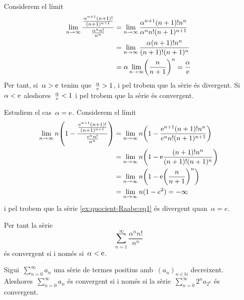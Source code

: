 \documentclass[../../main.tex]{subfiles}
\begin{document}
    \begin{solution}
        Considerem el límit
        \begin{align*}
            \lim_{n\to\infty}\frac{\frac{\alpha^{n+1}(n+1)!}{(n+1)^{n+1}}}{\frac{\alpha^{n}n!}{n^{n}}}&=\lim_{n\to\infty}\frac{\alpha^{n+1}(n+1)!n^{n}}{\alpha^{n}n!(n+1)^{n+1}} \\
            &=\lim_{n\to\infty}\frac{\alpha(n+1)!n^{n}}{(n+1)!(n+1)^{n}} \\
            &=\alpha\lim_{n\to\infty}\left(\frac{n}{n+1}\right)^{n}=\frac{\alpha}{\e} %
        \end{align*}
        Per tant, si~\(\alpha>\mathrm{e}\) tenim que~\(\frac{\alpha}{\mathrm{e}}>1\), i pel  trobem que la sèrie és divergent.
        Si~\(\alpha<\mathrm{e}\) aleshores~\(\frac{\alpha}{\mathrm{e}}<1\) i pel  trobem que la sèrie és convergent.

        Estudiem el cas~\(\alpha=\mathrm{e}\).
        Considerem el límit
        \begin{align*}
            \lim_{n\to\infty}n\left(1-\frac{\frac{\e^{n+1}(n+1)!}{(n+1)^{n+1}}}{\frac{\e^{n}n!}{n^{n}}}\right)&=\lim_{n\to\infty}n\left(1-\frac{\e^{n+1}(n+1)!n^{n}}{e^{n}n!(n+1)^{n+1}}\right) \\
            &=\lim_{n\to\infty}n\left(1-\e\frac{(n+1)!n^{n}}{(n+1)!(n+1)^{n}}\right) \\
            &=\lim_{n\to\infty}n\left(1-\e\left(\frac{n}{n+1}\right)^{n}\right) \\
            &=\lim_{n\to\infty}n(1-e^{2})=-\infty %
        \end{align*}
        i pel  trobem que la sèrie \eqref{ex:quocient-Raabe:eq1} és divergent quan~\(\alpha=e\).

        Per tant la sèrie
        \[
            \sum_{n=1}^{\infty}\frac{\alpha^{n}n!}{n^{n}}
        \]
        és convergent si i només si~\(\alpha<\mathrm{e}\).
    \end{solution}
    \begin{proposition}
        \label{prop:criteri-de-condensacio}
        Sigui~\(\sum_{n=0}^{\infty}a_{n}\) una sèrie de termes positius amb~\((a_{n})_{n\in\mathbb{N}}\) decreixent.
        Aleshores~\(\sum_{n=0}^{\infty}a_{n}\) és convergent si i només si la sèrie~\(\sum_{n=0}^{\infty}2^{n}a_{2^{n}}\) és convergent.
    \end{proposition}
\end{document}
